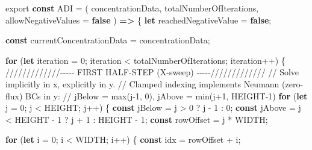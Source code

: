 \documentclass[
  letterpaper,
  DIV=11,
  numbers=noendperiod]{scrreprt}
\newenvironment{Shaded}{\begin{snugshade}}{\end{snugshade}}
\newcommand{\CommentTok}[1]{\textcolor[rgb]{0.37,0.37,0.37}{#1}}
\newcommand{\ControlFlowTok}[1]{\textcolor[rgb]{0.00,0.23,0.31}{\textbf{#1}}}
\newcommand{\DecValTok}[1]{\textcolor[rgb]{0.68,0.00,0.00}{#1}}
\newcommand{\ImportTok}[1]{\textcolor[rgb]{0.00,0.46,0.62}{#1}}
\newcommand{\KeywordTok}[1]{\textcolor[rgb]{0.00,0.23,0.31}{\textbf{#1}}}
\newcommand{\NormalTok}[1]{\textcolor[rgb]{0.00,0.23,0.31}{#1}}
\newcommand{\OperatorTok}[1]{\textcolor[rgb]{0.37,0.37,0.37}{#1}}
\begin{document}
\label{adi-main-function}%
\begin{Shaded}
\begin{Highlighting}[]
\ImportTok{export} \KeywordTok{const}\NormalTok{ ADI }\OperatorTok{=}\NormalTok{ (}
\NormalTok{    concentrationData}\OperatorTok{,}
\NormalTok{    totalNumberOfIterations}\OperatorTok{,}
\NormalTok{    allowNegativeValues }\OperatorTok{=} \KeywordTok{false}
\NormalTok{) }\KeywordTok{=\textgreater{}}\NormalTok{ \{}
    \KeywordTok{let}\NormalTok{ reachedNegativeValue }\OperatorTok{=} \KeywordTok{false}\OperatorTok{;}

    \KeywordTok{const}\NormalTok{ currentConcentrationData }\OperatorTok{=}\NormalTok{ concentrationData}\OperatorTok{;}

    \ControlFlowTok{for}\NormalTok{ (}\KeywordTok{let}\NormalTok{ iteration }\OperatorTok{=} \DecValTok{0}\OperatorTok{;}\NormalTok{ iteration }\OperatorTok{\textless{}}\NormalTok{ totalNumberOfIterations}\OperatorTok{;}\NormalTok{ iteration}\OperatorTok{++}\NormalTok{) \{}
        \CommentTok{/////////////{-}{-}{-}{-}{-}  FIRST HALF{-}STEP (X{-}sweep)  {-}{-}{-}{-}{-}/////////////}
        \CommentTok{// Solve implicitly in x, explicitly in y.}
        \CommentTok{// Clamped indexing implements Neumann (zero{-}flux) BCs in y:}
        \CommentTok{//   jBelow = max(j{-}1, 0),  jAbove = min(j+1, HEIGHT{-}1)}
        \ControlFlowTok{for}\NormalTok{ (}\KeywordTok{let}\NormalTok{ j }\OperatorTok{=} \DecValTok{0}\OperatorTok{;}\NormalTok{ j }\OperatorTok{\textless{}}\NormalTok{ HEIGHT}\OperatorTok{;}\NormalTok{ j}\OperatorTok{++}\NormalTok{) \{}
            \KeywordTok{const}\NormalTok{ jBelow }\OperatorTok{=}\NormalTok{ j }\OperatorTok{\textgreater{}} \DecValTok{0} \OperatorTok{?}\NormalTok{ j }\OperatorTok{{-}} \DecValTok{1} \OperatorTok{:} \DecValTok{0}\OperatorTok{;}
            \KeywordTok{const}\NormalTok{ jAbove }\OperatorTok{=}\NormalTok{ j }\OperatorTok{\textless{}}\NormalTok{ HEIGHT }\OperatorTok{{-}} \DecValTok{1} \OperatorTok{?}\NormalTok{ j }\OperatorTok{+} \DecValTok{1} \OperatorTok{:}\NormalTok{ HEIGHT }\OperatorTok{{-}} \DecValTok{1}\OperatorTok{;}
            \KeywordTok{const}\NormalTok{ rowOffset }\OperatorTok{=}\NormalTok{ j }\OperatorTok{*}\NormalTok{ WIDTH}\OperatorTok{;}

            \ControlFlowTok{for}\NormalTok{ (}\KeywordTok{let}\NormalTok{ i }\OperatorTok{=} \DecValTok{0}\OperatorTok{;}\NormalTok{ i }\OperatorTok{\textless{}}\NormalTok{ WIDTH}\OperatorTok{;}\NormalTok{ i}\OperatorTok{++}\NormalTok{) \{}
                \KeywordTok{const}\NormalTok{ idx }\OperatorTok{=}\NormalTok{ rowOffset }\OperatorTok{+}\NormalTok{ i}\OperatorTok{;}


\end{Highlighting}
\end{Shaded}
\end{document}
